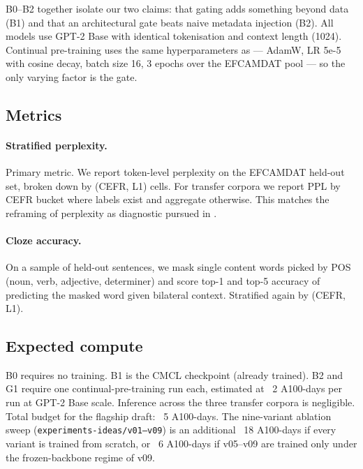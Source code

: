 B0--B2 together isolate our two claims: that gating adds something
beyond data (B1) and that an architectural gate beats naive metadata
injection (B2). All models use GPT-2 Base with identical tokenisation
and context length (1024). Continual pre-training uses the same
hyperparameters as \citet{stearns2026artificial} --- AdamW, LR 5e-5 with
cosine decay, batch size 16, 3 epochs over the EFCAMDAT pool --- so the
only varying factor is the gate.

\subsection{Metrics}
\label{subsec:metrics}

\paragraph{Stratified perplexity.}
Primary metric. We report token-level perplexity on the EFCAMDAT
held-out set, broken down by (CEFR, L1) cells. For transfer corpora we
report PPL by CEFR bucket where labels exist and aggregate otherwise.
This matches the reframing of perplexity as diagnostic pursued in
\citet{stearns2025nwpaleval}.

\paragraph{Cloze accuracy.}
On a sample of held-out sentences, we mask single content words picked
by POS (noun, verb, adjective, determiner) and score top-1 and top-5
accuracy of predicting the masked word given bilateral context.
Stratified again by (CEFR, L1).

\subsection{Expected compute}
\label{subsec:compute}

B0 requires no training. B1 is the CMCL checkpoint (already trained).
B2 and G1 require one continual-pre-training run each, estimated at
~2 A100-days per run at GPT-2 Base scale. Inference across the three
transfer corpora is negligible. Total budget for the flagship draft:
~5 A100-days. The nine-variant ablation sweep
(\texttt{experiments-ideas/v01--v09}) is an additional ~18 A100-days if
every variant is trained from scratch, or ~6 A100-days if v05--v09 are
trained only under the frozen-backbone regime of v09.
